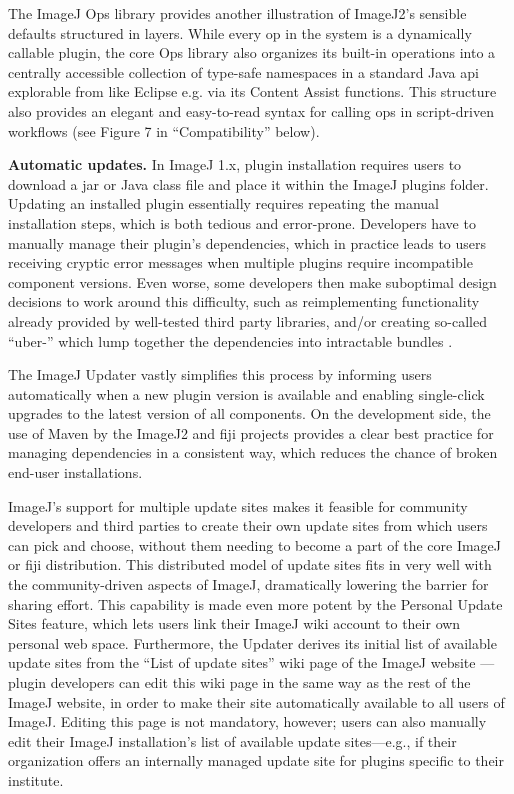 \documentclass{bmcart}
\begin{document}
The ImageJ Ops library provides another illustration of ImageJ2's sensible
defaults structured in layers. While every op in the system is a dynamically
callable plugin, the core Ops library also organizes its built-in operations
into a centrally accessible collection of type-safe namespaces in a standard
Java \acrshort{api} explorable from  like Eclipse e.g. via its
Content Assist functions. This structure also provides an elegant and
easy-to-read syntax for calling ops in script-driven workflows (see Figure 7 in
``Compatibility'' below).

\textbf{Automatic updates.} In ImageJ 1.x, plugin installation requires users
to download a \acrfull{jar} or Java class file and place it within the ImageJ
plugins folder. Updating an installed plugin essentially requires repeating the
manual installation steps, which is both tedious and error-prone. Developers
have to manually manage their plugin's dependencies, which in practice leads to
users receiving cryptic error messages when multiple plugins require
incompatible component versions. Even worse, some developers then make
suboptimal design decisions to work around this difficulty, such as
reimplementing functionality already provided by well-tested third party
libraries, and/or creating so-called ``uber-'' which lump
together the dependencies into intractable bundles \cite{imagej_uber_jar}.

The ImageJ Updater vastly simplifies this process by informing users
automatically when a new plugin version is available and enabling single-click
upgrades to the latest version of all components. On the development side, the
use of Maven by the ImageJ2 and \acrshort{fiji} projects provides a clear best
practice for managing dependencies in a consistent way, which reduces the
chance of broken end-user installations.

ImageJ's support for multiple update sites makes it feasible for community
developers and third parties to create their own update sites from which users
can pick and choose, without them needing to become a part of the core ImageJ
or \acrshort{fiji} distribution. This distributed model of update sites fits in
very well with the community-driven aspects of ImageJ, dramatically lowering
the barrier for sharing effort. This capability is made even more potent by the
Personal Update Sites feature, which lets users link their ImageJ wiki account
to their own personal web space. Furthermore, the Updater derives its initial
list of available update sites from the ``List of update sites'' wiki page of
the ImageJ website \cite{imagej_list_of_update_sites}---plugin developers can
edit this wiki page in the same way as the rest of the ImageJ website, in order
to make their site automatically available to all users of ImageJ. Editing this
page is not mandatory, however; users can also manually edit their ImageJ
installation's list of available update sites---e.g., if their organization
offers an internally managed update site for plugins specific to their
institute.
\end{document}
